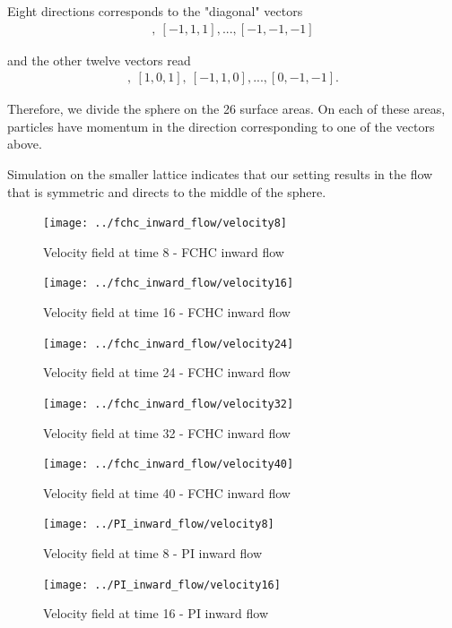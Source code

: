 Eight directions corresponds to the "diagonal" vectors
\begin{align}
[1,1,1],~[-1,1,1],...,[-1,-1,-1]
\end{align}

and the other twelve vectors read
\begin{align}
[1,1,0],~[1,0,1],~[-1,1,0],...,[0,-1,-1].
\end{align}

Therefore, we divide the sphere on the 26 surface areas. On each of these areas, particles have momentum in the direction corresponding to one of the vectors above.

Simulation on the smaller lattice indicates that our setting results in the flow that is symmetric and directs to the middle of the sphere.

\begin{figure}[H] 
 \centering 
 \texttt{[image: ../fchc\_inward\_flow/velocity8]}
 \label{cubosphere}
 \caption{Velocity field at time 8 - FCHC inward flow}
\end{figure}

\begin{figure}[H] 
 \centering 
 \texttt{[image: ../fchc\_inward\_flow/velocity16]}
 \caption{Velocity field at time 16 - FCHC inward flow}
\end{figure}


\begin{figure}[H] 
 \centering 
 \texttt{[image: ../fchc\_inward\_flow/velocity24]}
 \caption{Velocity field at time 24 - FCHC inward flow}
\end{figure}


\begin{figure}[H] 
 \centering 
 \texttt{[image: ../fchc\_inward\_flow/velocity32]}
 \caption{Velocity field at time 32 - FCHC inward flow}
\end{figure}


\begin{figure}[H] 
 \centering 
 \texttt{[image: ../fchc\_inward\_flow/velocity40]}
 \caption{Velocity field at time 40 - FCHC inward flow}
\end{figure}


\begin{figure}[H] 
 \centering 
 \texttt{[image: ../PI\_inward\_flow/velocity8]}
 \label{cubosphere}
 \caption{Velocity field at time 8 - PI inward flow}
\end{figure}

\begin{figure}[H] 
 \centering 
 \texttt{[image: ../PI\_inward\_flow/velocity16]}
 \caption{Velocity field at time 16 - PI inward flow}
\end{figure}


